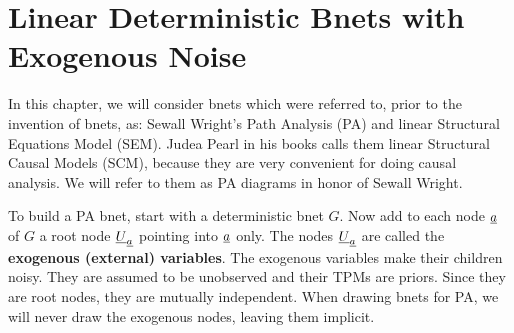 \chapter{Linear Deterministic Bnets with Exogenous 
Noise}

In this chapter, we will consider 
bnets which were referred to,
prior to the invention of bnets, as:
Sewall Wright's Path Analysis (PA) and
linear Structural Equations Model (SEM).
Judea Pearl in his
books calls them
linear Structural Causal Models (SCM),
because they are very 
convenient for doing causal analysis.
We will refer  to
them as PA diagrams
in honor of Sewall Wright.


To 
build a PA bnet,
start with a deterministic bnet $G$.
Now  
add to each node ${\underline{a}}$ of $G$ a 
root node ${\underline{U}}_{\underline{a}}$
pointing into ${\underline{a}}$ only.
The nodes ${\underline{U}}_{\underline{a}}$ are called
the {\bf exogenous (external) variables}.
The exogenous
variables make their children noisy.
They are assumed 
to be unobserved
and their TPMs are priors.
Since they are 
root nodes, they are 
mutually independent.
When
drawing
bnets for PA,
we will
never draw the exogenous nodes,
leaving them implicit.

